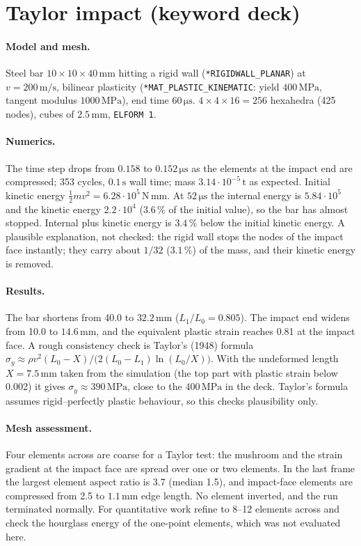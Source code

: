 \documentclass[11pt,a4paper]{article}
\newcommand{\unit}[1]{\,\mathrm{#1}}
\begin{document}
\section{Taylor impact (keyword deck)}

\paragraph{Model and mesh.} Steel bar $10\times10\times40\unit{mm}$ hitting a rigid wall
(\texttt{*RIGIDWALL\_PLANAR}) at $v=200\unit{m/s}$, bilinear plasticity
(\texttt{*MAT\_PLASTIC\_KINEMATIC}: yield $400\unit{MPa}$, tangent modulus $1000\unit{MPa}$), end
time $60\unit{\mu s}$. $4\times4\times16=256$ hexahedra (425 nodes), cubes of $2.5\unit{mm}$,
\texttt{ELFORM~1}.

\paragraph{Numerics.} The time step drops from $0.158$ to $0.152\unit{\mu s}$ as the elements at
the impact end are compressed; 353 cycles, $0.1\unit{s}$ wall time; mass
$3.14\cdot10^{-5}\unit{t}$ as expected. Initial kinetic energy $\tfrac12 m v^2=6.28\cdot10^{5}\unit{N\,mm}$.
At $52\unit{\mu s}$ the internal energy is $5.84\cdot10^{5}$ and the kinetic energy $2.2\cdot10^{4}$
($3.6\,\%$ of the initial value), so the bar has almost stopped. Internal plus kinetic energy is
$3.4\,\%$ below the initial kinetic energy. A plausible explanation, not checked: the rigid wall
stops the nodes of the impact face instantly; they carry about $1/32$ ($3.1\,\%$) of the mass,
and their kinetic energy is removed.

\paragraph{Results.} The bar shortens from 40.0 to $32.2\unit{mm}$ ($L_1/L_0=0.805$). The
impact end widens from 10.0 to $14.6\unit{mm}$, and the equivalent plastic strain reaches 0.81 at
the impact face. A rough consistency check is Taylor's (1948) formula
$\sigma_y\approx\rho v^2 (L_0-X)/\bigl(2(L_0-L_1)\ln(L_0/X)\bigr)$. With the undeformed length
$X=7.5\unit{mm}$ taken from the simulation (the top part with plastic strain below 0.002) it gives
$\sigma_y\approx390\unit{MPa}$, close to the $400\unit{MPa}$ in the deck. Taylor's formula assumes
rigid--perfectly plastic behaviour, so this checks plausibility only.

\paragraph{Mesh assessment.} Four elements across are coarse for a Taylor test: the mushroom and
the strain gradient at the impact face are spread over one or two elements. In the last frame the
largest element aspect ratio is 3.7 (median 1.5), and impact-face elements are compressed from
2.5 to $1.1\unit{mm}$ edge length. No element inverted, and the run terminated normally. For
quantitative work refine to 8--12 elements across and check the hourglass energy of the
one-point elements, which was not evaluated here.
\end{document}
